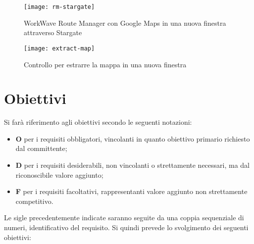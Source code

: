 \begin{figure}[H] 
    \centering 
    \texttt{[image: rm-stargate]} 
    \caption{WorkWave Route Manager con Google Maps in una nuova finestra attraverso Stargate}
\end{figure}

\begin{figure}[H] 
    \centering 
    \texttt{[image: extract-map]} 
    \caption{Controllo per estrarre la mappa in una nuova finestra}
\end{figure}
  
\section{Obiettivi}

Si farà riferimento agli obiettivi secondo le seguenti notazioni:

\begin{itemize}
    \item \textbf{O} per i requisiti obbligatori, vincolanti in quanto obiettivo primario richiesto dal committente;
    \item \textbf{D} per i requisiti desiderabili, non vincolanti o strettamente necessari, ma dal riconoscibile valore aggiunto;
    \item \textbf{F} per i requisiti facoltativi, rappresentanti valore aggiunto non strettamente competitivo.
\end{itemize}

Le sigle precedentemente indicate saranno seguite da una coppia sequenziale di numeri, identificativo del requisito. Si quindi prevede lo svolgimento dei seguenti obiettivi:

